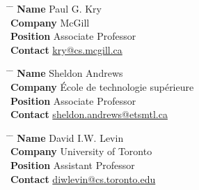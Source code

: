 \documentclass[10pt]{article} %
\begin{document}
\noindent\parbox{0.5\textwidth}{
\begin{tabbing}
\hspace{2.75cm} \= \hspace{4cm} \= \kill
{\bf Name} \> Paul G. Kry\\ 
{\bf Company} \> McGill\\ 
{\bf Position} \> Associate Professor \\ 
{\bf Contact} \> \href{mailto:kry@cs.mcgill.ca}{kry@cs.mcgill.ca}
\end{tabbing}}

\noindent\parbox{0.5\textwidth}{
\begin{tabbing}
\hspace{2.75cm} \= \hspace{4cm} \= \kill
{\bf Name} \> Sheldon Andrews\\ 
{\bf Company} \> École de technologie supérieure\\ 
{\bf Position} \> Associate Professor \\ 
{\bf Contact} \> \href{mailto:sheldon.andrews@etsmtl.ca}{sheldon.andrews@etsmtl.ca}
\end{tabbing}}

\noindent\parbox{0.5\textwidth}{
\begin{tabbing}
\hspace{2.75cm} \= \hspace{4cm} \= \kill
{\bf Name} \> David I.W. Levin\\ 
{\bf Company} \> University of Toronto\\ 
{\bf Position} \>Assistant Professor \\ 
{\bf Contact} \> \href{mailto:diwlevin@cs.toronto.edu}{diwlevin@cs.toronto.edu}
\end{tabbing}}


\end{document}

